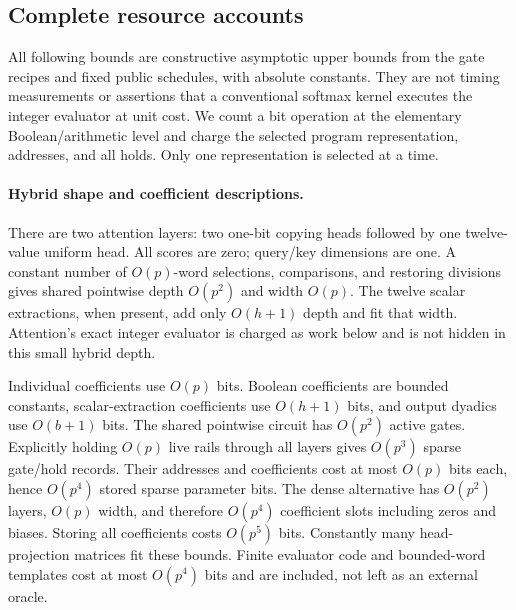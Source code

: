 \subsection{Complete resource accounts}\label{sec:impl-ledgers}

All following bounds are constructive asymptotic upper bounds from the
gate recipes and fixed public schedules, with absolute constants. They
are not timing measurements or assertions that a conventional softmax
kernel executes the integer evaluator at unit cost. We count a bit
operation at the elementary Boolean/arithmetic level and charge the
selected program representation, addresses, and all holds. Only one
representation is selected at a time.

\paragraph{Hybrid shape and coefficient descriptions.}
There are two attention layers: two one-bit copying heads followed by one
twelve-value uniform head. All scores are zero; query/key dimensions are
one. A constant number of $O(p)$-word selections, comparisons, and
restoring divisions gives shared pointwise depth $O(p^2)$ and width
$O(p)$. The twelve scalar extractions, when present, add only $O(h+1)$
depth and fit that width. Attention's exact integer evaluator is charged
as work below and is not hidden in this small hybrid depth.

Individual coefficients use $O(p)$ bits. Boolean coefficients are bounded
constants, scalar-extraction coefficients use $O(h+1)$ bits, and output
dyadics use $O(b+1)$ bits. The shared pointwise circuit has $O(p^2)$ active
gates. Explicitly holding $O(p)$ live rails through all layers gives
$O(p^3)$ sparse gate/hold records. Their addresses and coefficients cost
at most $O(p)$ bits each, hence $O(p^4)$ stored sparse parameter bits.
The dense alternative has $O(p^2)$ layers, $O(p)$ width, and therefore
$O(p^4)$ coefficient slots including zeros and biases. Storing all
coefficients costs $O(p^5)$ bits. Constantly many head-projection matrices
fit these bounds. Finite evaluator code and bounded-word templates cost
at most $O(p^4)$ bits and are included, not left as an external oracle.

